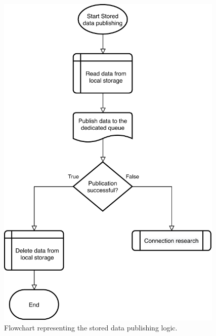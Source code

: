 \begin{figure}[h]
\begin{minipage}[b]{8.5cm}
\label{fig:flowconnection}
\end{minipage}
\ \hspace{2mm} \hspace{3mm} \
\begin{minipage}[b]{8.5cm}
\centering
\includegraphics[width=0.97\textwidth]{images/flowstorage}
\caption{Flowchart representing the stored data publishing logic.}
\label{fig:flowstorage}
\end{minipage}
\end{figure}



